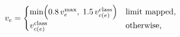 \documentclass[border=2pt,12pt]{standalone}
\begin{document}
$\displaystyle v_e=\begin{cases}\min\!\left(0.8\,v^{\max}_e,\;1.5\,v^{\rm class}_{c(e)}\right) & \text{limit mapped,}\\[2pt] v^{\rm class}_{c(e)} & \text{otherwise,}\end{cases}$
\end{document}
